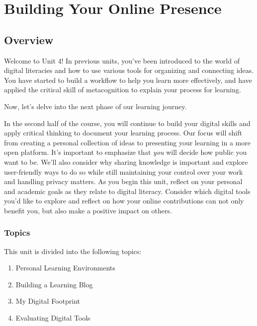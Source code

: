 \documentclass[
]{book}
\providecommand{\tightlist}{%
  \setlength{\itemsep}{0pt}\setlength{\parskip}{0pt}}
\theoremstyle{definition}
\theoremstyle{definition}
\theoremstyle{definition}
\theoremstyle{definition}
\theoremstyle{remark}
\begin{document}
\hypertarget{building-your-online-presence}{%
\chapter{Building Your Online Presence}\label{building-your-online-presence}}

\hypertarget{overview-3}{%
\section*{Overview}\label{overview-3}}

Welcome to Unit 4! In previous units, you've been introduced to the world of digital literacies and how to use various tools for organizing and connecting ideas. You have started to build a workflow to help you learn more effectively, and have applied the critical skill of metacognition to explain your process for learning.

Now, let's delve into the next phase of our learning journey.

In the second half of the course, you will continue to build your digital skills and apply critical thinking to document your learning process. Our focus will shift from creating a personal collection of ideas to presenting your learning in a more open platform. It's important to emphasize that \emph{you} will decide how public you want to be. We'll also consider why sharing knowledge is important and explore user-friendly ways to do so while still maintaining your control over your work and handling privacy matters. As you begin this unit, reflect on your personal and academic goals as they relate to digital literacy. Consider which digital tools you'd like to explore and reflect on how your online contributions can not only benefit you, but also make a positive impact on others.

\hypertarget{topics-3}{%
\subsection*{Topics}\label{topics-3}}

This unit is divided into the following topics:

\begin{enumerate}
\def\labelenumi{\arabic{enumi}.}
\tightlist
\item
  Personal Learning Environments\\
\item
  Building a Learning Blog\\
\item
  My Digital Footprint\\
\item
  Evaluating Digital Tools
\end{enumerate}
\end{document}
